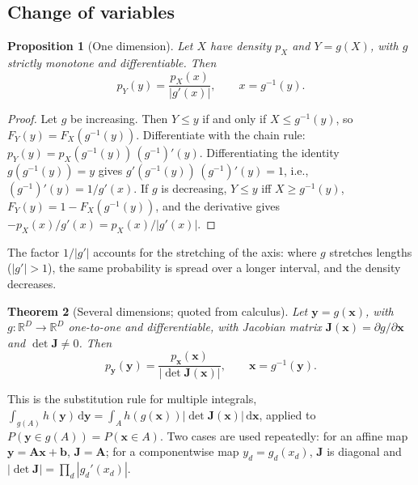 \documentclass[11pt,a4paper]{article}
\numberwithin{equation}{section}
\theoremstyle{plain}
\newtheorem{proposition}{Proposition}[section]
\newtheorem{theorem}[proposition]{Theorem}
\theoremstyle{definition}
\theoremstyle{remark}
\newcommand{\x}{\mathbf{x}}
\newcommand{\y}{\mathbf{y}}
\newcommand{\bb}{\mathbf{b}}
\newcommand{\Ab}{\mathbf{A}}
\newcommand{\R}{\mathbb{R}}
\newcommand{\dd}{\,\mathrm{d}}
\begin{document}
\subsection{Change of variables}
\begin{proposition}[One dimension]
\label{prop:cov1d}
Let $X$ have density $p_X$ and $Y=g(X)$, with $g$ strictly monotone and differentiable. Then
\begin{equation}
p_Y(y)=\frac{p_X(x)}{|g'(x)|},\qquad x=g^{-1}(y).
\end{equation}
\end{proposition}
\begin{proof}
Let $g$ be increasing. Then $Y\le y$ if and only if $X\le g^{-1}(y)$, so $F_Y(y)=F_X(g^{-1}(y))$.
Differentiate with the chain rule: $p_Y(y)=p_X(g^{-1}(y))\,(g^{-1})'(y)$.
Differentiating the identity $g(g^{-1}(y))=y$ gives $g'(g^{-1}(y))\,(g^{-1})'(y)=1$, i.e., $(g^{-1})'(y)=1/g'(x)$.
If $g$ is decreasing, $Y\le y$ iff $X\ge g^{-1}(y)$, $F_Y(y)=1-F_X(g^{-1}(y))$, and the derivative gives $-p_X(x)/g'(x)=p_X(x)/|g'(x)|$.
\end{proof}
The factor $1/|g'|$ accounts for the stretching of the axis: where $g$ stretches lengths ($|g'|>1$), the same probability is spread over a longer interval, and the density decreases.

\begin{theorem}[Several dimensions; quoted from calculus]
\label{thm:cov_multi}
Let $\y=g(\x)$, with $g:\R^D\to\R^D$ one-to-one and differentiable, with Jacobian matrix $\mathbf J(\x)=\partial g/\partial\x$ and $\det\mathbf J\neq0$. Then
\begin{equation}
p_{\y}(\y)=\frac{p_{\x}(\x)}{|\det\mathbf J(\x)|},\qquad \x=g^{-1}(\y).
\end{equation}
\end{theorem}
This is the substitution rule for multiple integrals, $\int_{g(A)}h(\y)\dd\y=\int_Ah(g(\x))|\det\mathbf J(\x)|\dd\x$, applied to $P(\y\in g(A))=P(\x\in A)$.
Two cases are used repeatedly: for an affine map $\y=\Ab\x+\bb$, $\mathbf J=\Ab$; for a componentwise map $y_d=g_d(x_d)$, $\mathbf J$ is diagonal and $|\det\mathbf J|=\prod_d|g_d'(x_d)|$.
\end{document}
